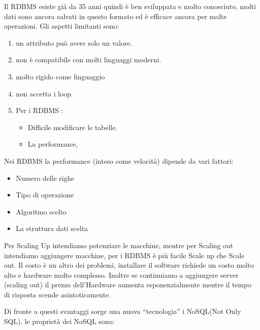 \documentclass[a4page, 11pt]{article}
\begin{document}
Il RDBMS esiste già da 35 anni quindi è ben sviluppata e molto conosciuto, molti dati sono ancora salvati in questo formato ed è efficace ancora per molte operazioni. Gli aspetti limitanti sono:

\begin{enumerate}[noitemsep]
	 
	\item
	un attributo può avere solo un valore.
	\item
	non è compatibile con molti linguaggi moderni.
	\item
	molto rigido come linguaggio
	\item
	non accetta i loop.
	\item
	Per i RDBMS :
	\begin{itemize}
		
		\item
		Difficile modificare le tabelle.
		\item
		La performance,
	\end{itemize}
\end{enumerate}

Nei RDBMS la performance (inteso come velocità) dipende da vari fattori:
\begin{itemize}[noitemsep]
	 
	\item
	Numero delle righe
	\item
	Tipo di operazione
	\item
	Algoritmo scelto
	\item
	La struttura dati scelta
\end{itemize}

Per Scaling Up intendiamo potenziare le macchine, mentre per Scaling out intendiamo aggiungere macchine, per i RDBMS è più facile Scale up che Scale out. 
Il costo è un altro dei problemi, installare il software richiede un costo molto alto e hardware molto complesso.
Inoltre se continuiamo a aggiungere server (scaling out) il prezzo dell'Hardware aumenta esponenzialmente mentre il tempo di risposta scende asintoticamente.

Di fronte a questi svantaggi sorge una nuova ``tecnologia'' i NoSQL(Not Only SQL), le proprietà dei NoSQL sono:
\end{document}
